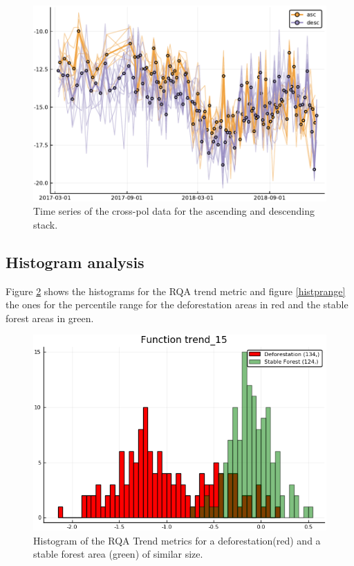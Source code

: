 \documentclass{article}
\begin{document}
\begin{figure}
  \includegraphics[width=\textwidth]{figs/vh_a_d_timeseries.pdf}
  \caption{Time series of the cross-pol data for the ascending and descending stack.
            }
  \label{ts_a_d}
\end{figure}



\subsection{Histogram analysis}

Figure \ref{histtrend} shows the histograms for the RQA trend metric and figure \ref{histprange} the ones for the percentile range for the deforestation areas in red and the stable forest areas in green.

\begin{figure}
  \includegraphics[width=\textwidth]{figs/histogram_trend1_5_0317_0319_polygon_5.png}
  \caption{Histogram of the RQA Trend metrics for a deforestation(red) and a stable forest area (green) of similar size.}
  \label{histtrend}
\end{figure}
\end{document}
